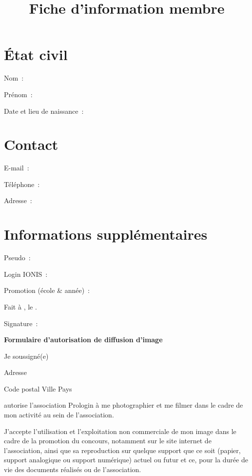 \documentclass[a4paper,12pt]{prologin}
\title{Fiche d'information membre}
\begin{document}
\section*{État civil}

Nom~: \hrulefill

Prénom~: \hrulefill

Date et lieu de naissance~: \hrulefill

\section*{Contact}

E-mail~: \hrulefill

Téléphone~: \hrulefill

Adresse~: \hrulefill

\hrulefill

\section*{Informations supplémentaires}
Pseudo~: \hrulefill

Login IONIS~: \hrulefill

Promotion (école \& année)~: \hrulefill

\vspace{2cm}

Fait à \hrulefill, le \hrulefill.

Signature~:

\newpage

\begin{Large}
    \begin{center}
        \textbf{Formulaire d'autorisation de diffusion d'image}
    \end{center}
\end{Large}

Je soussigné(e) \hrulefill

Adresse \hrulefill

Code postal \hrulefill{} Ville \hrulefill\hrulefill\hrulefill{} Pays \hrulefill

autorise l'association Prologin à me photographier et me filmer dans
le cadre de mon activité au sein de l'association.

J'accepte l'utilisation et l'exploitation non commerciale de mon
image dans le cadre de la promotion du concours, notamment sur le site internet
de l'association, ainsi que sa reproduction sur quelque support que ce soit
(papier, support analogique ou support numérique) actuel ou futur et ce, pour la
durée de vie des documents réalisés ou de l'association.
\end{document}
